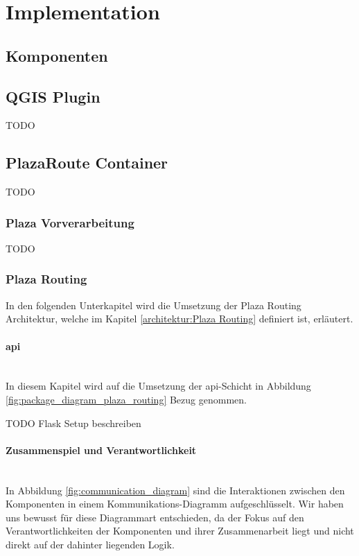 
\section{Implementation}
\label{sec:Implementation}

\subsection{Komponenten}
\label{impl:Komponenten}

\subsection{QGIS Plugin}
\label{impl:QGIS Plugin}
TODO

\subsection{PlazaRoute Container}
\label{impl:PlazaRoute Container}
TODO

\subsubsection{Plaza Vorverarbeitung}
\label{impl:Plaza Vorverarbeitung}
TODO

\subsubsection{Plaza Routing}
\label{impl:Plaza Routing}
In den folgenden Unterkapitel wird die Umsetzung der Plaza Routing Architektur, welche im Kapitel \ref{architektur:Plaza Routing} definiert ist, erläutert. 

\paragraph{api}\label{impl:Plaza Routing api}~\\
In diesem Kapitel wird auf die Umsetzung der api-Schicht in Abbildung \ref{fig:package_diagram_plaza_routing} Bezug genommen.

TODO Flask Setup beschreiben

\paragraph{Zusammenspiel und Verantwortlichkeit}\label{impl:Plaza Routing Zusammenspielund Verantwortlichkeit}~\\
In Abbildung \ref{fig:communication_diagram} sind die Interaktionen zwischen den Komponenten in einem Kommunikations-Diagramm aufgeschlüsselt. Wir haben uns bewusst für diese Diagrammart entschieden, da der Fokus auf den Verantwortlichkeiten der Komponenten und ihrer Zusammenarbeit liegt und nicht direkt auf der dahinter liegenden Logik.


